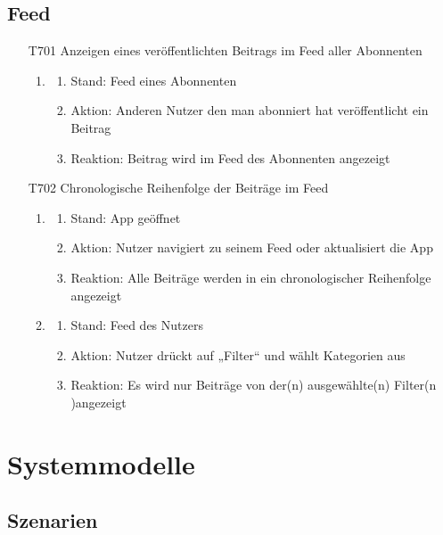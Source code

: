 \documentclass[parskip=full]{scrartcl}
\begin{document}
	\subsection{\gls{Feed}}
	\begin{itemize}
		\item[T701] Anzeigen eines veröffentlichten Beitrags im \gls{Feed} aller \gls{Abonnenten}
		\begin{enumerate}
			\item
			\begin{enumerate}[nosep]	
				\item Stand: \gls{Feed} eines \gls{Abonnenten}
				\item Aktion: Anderen Nutzer den man abonniert hat veröffentlicht ein Beitrag
				\item Reaktion: Beitrag wird im \gls{Feed} des \gls{Abonnenten} angezeigt
			\end{enumerate} 
		\end{enumerate}
		
		\item[T702]  Chronologische Reihenfolge der Beiträge im \gls{Feed}
		\begin{enumerate}
			\item
			\begin{enumerate}[nosep]	
				\item Stand: \gls{App} geöffnet
				\item Aktion: Nutzer  navigiert zu seinem \gls{Feed} oder aktualisiert die \gls{App}
				\item Reaktion:  Alle Beiträge werden  in ein chronologischer Reihenfolge angezeigt
			\end{enumerate} 
			\item
			\begin{enumerate}[nosep]	
				\item Stand: \gls{Feed} des Nutzers
				\item Aktion: Nutzer  drückt auf „Filter“ und wählt  \gls{Kategorie}n aus
				\item Reaktion: Es  wird nur Beiträge von der(n) ausgewählte(n) Filter(n )angezeigt
			\end{enumerate}
		\end{enumerate}
	\end{itemize}
	
	
	\newpage
	\section{Systemmodelle}
	\subsection{Szenarien}
\end{document}

